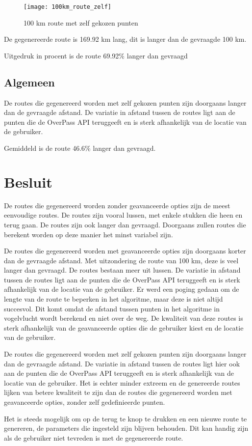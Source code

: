\begin{figure}[H]
    \centering
    \texttt{[image: 100km\_route\_zelf]}
    \caption{100 km route met zelf gekozen punten}
    \label{fig:100km_route_zelf}

\end{figure}

De gegenereerde route is 169.92 km lang, dit is langer dan de gevraagde 100 km.

Uitgedruk in procent is de route 69.92\% langer dan gevraagd


\pagebreak

\subsection{Algemeen}

De routes die gegenereerd worden met zelf gekozen punten zijn doorgaans langer dan de gevraagde afstand. De variatie in afstand tussen de routes ligt aan de punten die de OverPass API teruggeeft en is sterk afhankelijk van de locatie van de gebruiker.

Gemiddeld is de route 46.6\% langer dan gevraagd.

\section{Besluit}

De routes die gegenereerd worden zonder geavanceerde opties zijn de meest eenvoudige routes. De routes zijn vooral lussen, met enkele stukken die heen en terug gaan. De routes zijn ook langer dan gevraagd.
Doorgaans zullen routes die berekent worden op deze manier het minst variabel zijn.

De routes die gegenereerd worden met geavanceerde opties zijn doorgaans korter dan de gevraagde afstand. Met uitzondering de route van 100 km, deze is veel langer dan gevraagd.
De routes bestaan meer uit lussen. De variatie in afstand tussen de routes ligt aan de punten die de OverPass API teruggeeft en is sterk afhankelijk van de locatie van de gebruiker.
Er werd een poging gedaan om de lengte van de route te beperken in het algoritme, maar deze is niet altijd succesvol. Dit komt omdat de afstand tussen punten in het algoritme in vogelvlucht wordt berekend en niet over de weg.
De kwaliteit van deze routes is sterk afhankelijk van de geavanceerde opties die de gebruiker kiest en de locatie van de gebruiker.

De routes die gegenereerd worden met zelf gekozen punten zijn doorgaans langer dan de gevraagde afstand. 
De variatie in afstand tussen de routes ligt hier ook aan de punten die de OverPass API teruggeeft en is sterk afhankelijk van de locatie van de gebruiker. 
Het is echter minder extreem en de genereerde routes lijken van betere kwaliteit te zijn dan de routes die gegenereerd worden met geavanceerde opties, zonder zelf gedefinieerde punten.

Het is steeds mogelijk om op de terug te knop te drukken en een nieuwe route te genereren, de parameters die ingesteld zijn blijven behouden. Dit kan handig zijn als de gebruiker niet tevreden is met de gegenereerde route.







